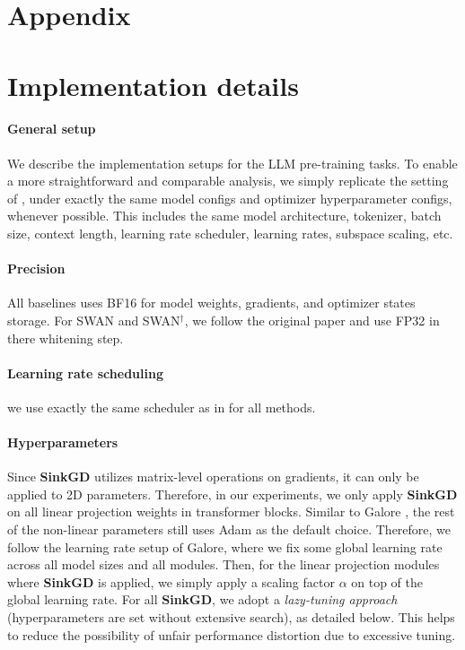 \section*{Appendix}


\section{Implementation details}\label{app: code}


\paragraph{General setup} We describe the implementation setups for the LLM pre-training tasks. To enable a more straightforward and comparable analysis, we simply replicate the setting of \cite{Zhao2024GaLoreML}, under exactly the same model configs and optimizer hyperparameter configs, whenever possible. This includes the same model architecture, tokenizer, batch size, context length, learning rate scheduler, learning rates, subspace scaling, etc.  

\paragraph{Precision} All baselines uses BF16 for model weights, gradients, and optimizer states storage. For SWAN and SWAN$^\dag$, we follow the original paper and use FP32 in there whitening step.

\paragraph{Learning rate scheduling} we use exactly the same scheduler as in \cite{Zhao2024GaLoreML} for all methods.



\paragraph{Hyperparameters} Since \textbf{SinkGD} utilizes matrix-level operations on gradients, it can only be applied to 2D parameters. Therefore, in our experiments, we only apply \textbf{SinkGD} on all linear projection weights in transformer blocks. Similar to Galore \citep{Zhao2024GaLoreML}, the rest of the non-linear parameters still uses Adam as the default choice. Therefore, we follow the learning rate setup of Galore, where we fix some global learning rate across all model sizes and all modules. Then, for the linear projection modules where \textbf{SinkGD} is applied, we simply apply a scaling factor $\alpha$ on top of the global learning rate.  For all \textbf{SinkGD}, we adopt a \emph{lazy-tuning approach} (hyperparameters are set without extensive search), as detailed below. This helps to reduce the possibility of unfair performance distortion due to excessive tuning.   

